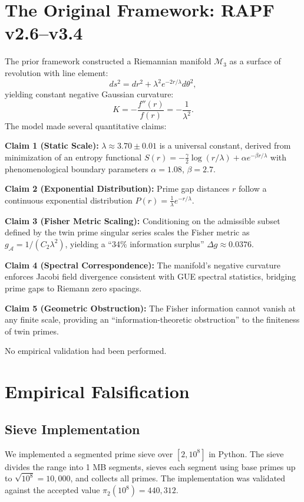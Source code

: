 \documentclass[11pt]{article}
\begin{document}
\section{The Original Framework: RAPF v2.6--v3.4}
The prior framework constructed a Riemannian manifold $\mathcal{M}_3$ as a surface of revolution with line element:
\begin{equation}
    ds^2 = dr^2 + \lambda^2 e^{-2r/\lambda} d\theta^2,
\end{equation}
yielding constant negative Gaussian curvature:
\begin{equation}
    K = -\frac{f''(r)}{f(r)} = -\frac{1}{\lambda^2}.
\end{equation}
The model made several quantitative claims:

\noindent \textbf{Claim 1 (Static Scale):} $\lambda \approx 3.70 \pm 0.01$ is a universal constant, derived from minimization of an entropy functional $S(r) = -\frac{\gamma}{2} \log(r/\lambda) + \alpha e^{-\beta r/\lambda}$ with phenomenological boundary parameters $\alpha = 1.08$, $\beta = 2.7$.

\noindent \textbf{Claim 2 (Exponential Distribution):} Prime gap distances $r$ follow a continuous exponential distribution $P(r) = \frac{1}{\lambda} e^{-r/\lambda}$.

\noindent \textbf{Claim 3 (Fisher Metric Scaling):} Conditioning on the admissible subset defined by the twin prime singular series scales the Fisher metric as $g_{\mathcal{A}} = 1/(C_2 \lambda^2)$, yielding a ``34\% information surplus'' $\Delta g \approx 0.0376$.

\noindent \textbf{Claim 4 (Spectral Correspondence):} The manifold's negative curvature enforces Jacobi field divergence consistent with GUE spectral statistics, bridging prime gaps to Riemann zero spacings.

\noindent \textbf{Claim 5 (Geometric Obstruction):} The Fisher information cannot vanish at any finite scale, providing an ``information-theoretic obstruction'' to the finiteness of twin primes.

No empirical validation had been performed.

\section{Empirical Falsification}
\subsection{Sieve Implementation}
We implemented a segmented prime sieve over $[2, 10^8]$ in Python. The sieve divides the range into 1 MB segments, sieves each segment using base primes up to $\sqrt{10^8} = 10{,}000$, and collects all primes. The implementation was validated against the accepted value $\pi_2(10^8) = 440{,}312$.
\end{document}
